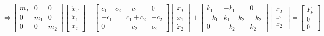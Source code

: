     \begin{equation*}
    \Longleftrightarrow
    \begin{bmatrix}
        m_T & 0 & 0 \\
        0 & m_1 & 0 \\
        0 & 0 & m_2
    \end{bmatrix}
    \begin{bmatrix}
        \ddot{x}_T \\ \ddot{x}_1 \\ \ddot{x}_2
    \end{bmatrix}
    +
    \begin{bmatrix}
        c_1 + c_2 & -c_1 & 0 \\
        -c_1 & c_1 + c_2 & -c_2 \\
        0 & -c_2 & c_2
    \end{bmatrix}
    \begin{bmatrix}
        \dot{x}_T \\ \dot{x}_1 \\ \dot{x}_2
    \end{bmatrix}
    +
    \begin{bmatrix}
        k_1 & -k_1 & 0 \\
        -k_1 & k_1 + k_2 & -k_2 \\
        0 & -k_2 & k_2
    \end{bmatrix}
    \begin{bmatrix}
        x_T \\ x_1 \\ x_2
    \end{bmatrix}
    =
    \begin{bmatrix}
        F_p \\ 0 \\ 0
    \end{bmatrix}
    \end{equation*}